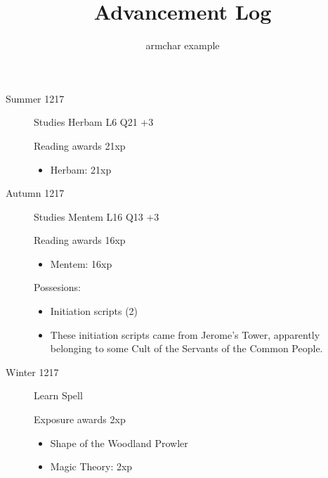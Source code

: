 \documentclass{scrartcl}
\title{Advancement Log}
\author{armchar example}
\begin{document}
\maketitle
\begin{description}
  \item[Summer 1217]
    Studies Herbam L6 Q21 +3

    Reading awards 21xp
    \begin{itemize}
      \item Herbam: 21xp
    \end{itemize}
  \item[Autumn 1217]
    Studies Mentem L16 Q13 +3

    Reading awards 16xp
    \begin{itemize}
      \item Mentem: 16xp
    \end{itemize}
    Possesions:
    \begin{itemize}
      \item Initiation scripts (2)
      \item These initiation scripts came from Jerome's Tower, apparently belonging to some Cult of the Servants of the Common People.
    \end{itemize}
  \item[Winter 1217]
    Learn Spell

    Exposure awards 2xp
    \begin{itemize}
      \item Shape of the Woodland Prowler
      \item Magic Theory: 2xp
    \end{itemize}
\end{description}
\end{document}
